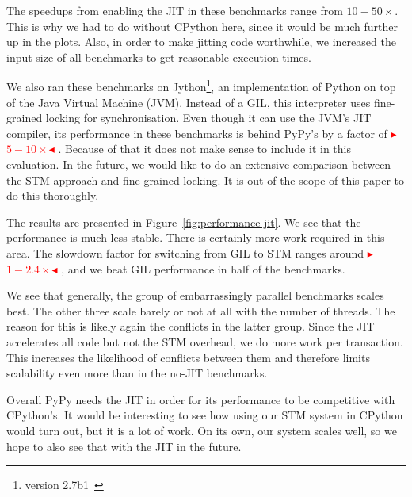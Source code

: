 \documentclass{sigplanconf}
\newcommand{\mynote}[2]{%
  \textcolor{red}{%
    \fbox{\bfseries\sffamily\scriptsize#1}%
    {\small$\blacktriangleright$\textsf{\emph{#2}}$\blacktriangleleft$}%
  }%
}
\newcommand\remi[1]{\mynote{Remi}{#1}}
\begin{document}
The speedups from enabling the JIT in these benchmarks range from
$10-50\times$. This is why we had to do without CPython here, since it
would be much further up in the plots. Also, in order to make jitting
code worthwhile, we increased the input size of all benchmarks to get
reasonable execution times.

We also ran these benchmarks on Jython\footnote{version
2.7b1~\cite{webjython}}, an implementation of Python on top of the
Java Virtual Machine (JVM).  Instead of a GIL, this interpreter uses
fine-grained locking for synchronisation. Even though it can use the
JVM's JIT compiler, its performance in these benchmarks is behind
PyPy's by a factor of \remi{$5-10\times$}. Because of that it does not
make sense to include it in this evaluation. In the future, we would
like to do an extensive comparison between the STM approach and
fine-grained locking. It is out of the scope of this paper to do
this thoroughly.

The results are presented in Figure~\ref{fig:performance-jit}. We
see that the performance is much less stable. There is certainly more
work required in this area. The slowdown factor for switching from GIL
to STM ranges around \remi{$1-2.4\times$}, and we beat GIL performance
in half of the benchmarks.

We see that generally, the group of embarrassingly parallel benchmarks scales
best. The other three scale barely or not at all with the number of
threads. The reason for this is likely again the conflicts in the
latter group. Since the JIT accelerates all code but not the STM
overhead, we do more work per transaction. This increases the
likelihood of conflicts between them and therefore limits scalability
even more than in the no-JIT benchmarks.

Overall PyPy needs the JIT in order for its performance to be
competitive with CPython's. It would be interesting to see how using
our STM system in CPython would turn out, but it is a lot of work. On
its own, our system scales well, so we hope to also see that with the
JIT in the future.
\end{document}
